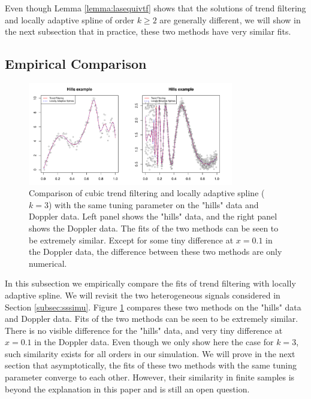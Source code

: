 \documentclass[a4paper]{article}
\begin{document}
Even though Lemma \eqref{lemma:lasequivtf} shows that the solutions of trend filtering and locally adaptive spline of order $k\geq 2$ are generally different, we will show in the next subsection that in practice, these two methods have very similar fits. 

\subsection{Empirical Comparison}
\label{subsec:emplasvstf}

\begin{figure}[t!]
\centering
\includegraphics[width = 0.8\textwidth]{Figures/Figure7.pdf}
\caption{Comparison of cubic trend filtering and locally adaptive spline ($k = 3$) with the same tuning parameter on the "hills" data and Doppler data. Left panel shows the "hills" data, and the right panel shows the Doppler data. The fits of the two methods can be seen to be extremely similar. Except for some tiny difference at $x= 0.1$ in the Doppler data, the difference between these two methods are only numerical.}
\label{fig:Figure7_lasvstf}
\end{figure}

In this subsection we empirically compare the fits of trend filtering with locally adaptive spline. We will revisit the two heterogeneous signals considered in Section \eqref{subsec:sssimu}. Figure \ref{fig:Figure7_lasvstf} compares these two methods on the "hills" data and Doppler data. Fits of the two methods can be seen to be extremely similar. There is no visible difference for the "hills" data, and very tiny difference at $x = 0.1$ in the Doppler data. Even though we only show here the case for $k = 3$, such similarity exists for all orders in our simulation. We will prove in the next section that asymptotically, the fits of these two methods with the same tuning parameter converge to each other. However, their similarity in finite samples is beyond the explanation in this paper and is still an open question.
\end{document}
